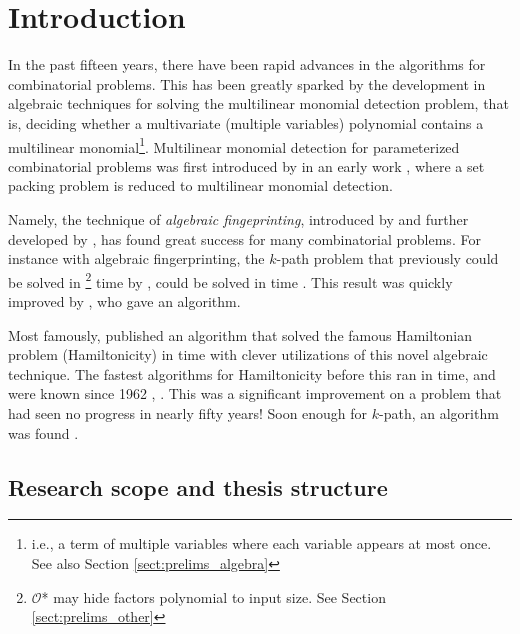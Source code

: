 
\section{Introduction}

In the past fifteen years, 
there have been rapid advances in the algorithms for combinatorial problems. 
This has been greatly sparked by the development in algebraic techniques for solving the 
multilinear monomial detection problem, that is, 
deciding whether a multivariate (multiple variables) 
polynomial contains a multilinear monomial\footnote{ 
i.e., a term of multiple variables where each variable appears at most once. 
See also Section \ref{sect:prelims_algebra}}. 
Multilinear monomial detection for parameterized combinatorial problems was 
first introduced by \citeauthor{Koutis05} in an early work 
\cite{Koutis05}, where a set packing problem is 
reduced to multilinear monomial detection.

Namely, the technique of \emph{algebraic fingeprinting},   
introduced by \citeauthor{Koutis08} \cite{Koutis08} and further developed by 
\citeauthor{Williams09} \cite{Williams09}, 
has found great success for many combinatorial problems. 
For instance with algebraic fingerprinting, the $k$-path problem 
that previously could be solved in 
\footnote{$\mathcal{O}$* may hide factors polynomial to input size. 
See Section \ref{sect:prelims_other}} 
time by \citeauthor{Chen07} \cite{Chen07}, 
could be solved in  time \cite{Koutis08}. 
This result was quickly improved by \cite{Williams09} \cite{Williams09}, 
who gave an  algorithm.

Most famously, 
\citeauthor{Björklund14} \cite{Björklund14} published an algorithm 
that solved the famous Hamiltonian problem (Hamiltonicity) in  time 
with clever utilizations of this novel algebraic technique. 
The fastest algorithms for Hamiltonicity before this ran in  time, 
and were known since 1962 \cite{HelKar62}, \cite{Bellman62}. 
This was a significant improvement on a problem 
that had seen no progress in nearly fifty years! 
Soon enough for $k$-path, 
an  algorithm was found \cite{Björklund17}.

\subsection{Research scope and thesis structure}

